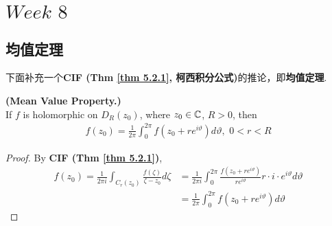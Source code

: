 \ifx\allfiles\undefined


	\else
	\fi

\chapter{$Week \,\, 8$}
\section{均值定理}
	下面补充一个\textbf{CIF (Thm \ref{thm 5.2.1}, 柯西积分公式)}的推论，即\textbf{均值定理}.
	\begin{proposition}\label{prop 8.1.1}
		\textbf{(Mean Value Property.)} \\
		If $f$ is holomorphic on $D_{R}(z_0)$, where $z_0 \in \mathbb{C}$, $R > 0$, then
		\begin{align}
			f(z_0) = \frac{1}{2 \pi}\int_{0}^{2\pi}{f(z_0 + re^{i\vartheta}) d\vartheta} , \,\, 0 < r < R
		\end{align}
	
		\vspace{2em}
		\begin{proof}
			By \textbf{CIF (Thm \ref{thm 5.2.1})},
			\begin{align}
				f(z_0) = \frac{1}{2 \pi i} \int_{C_{r}(z_0)}{\frac{f(\zeta)}{\zeta - z_0} d\zeta}
				&= \frac{1}{2 \pi i} \int_{0}^{2\pi}{\frac{f(z_0 + re^{i\vartheta})}{re^{i\vartheta}} r \cdot i \cdot e^{i\vartheta} d\vartheta} \\
				&= \frac{1}{2 \pi}\int_{0}^{2\pi}{f(z_0 + re^{i\vartheta}) d\vartheta}
			\end{align}
		\end{proof}
	\end{proposition}

\newpage
